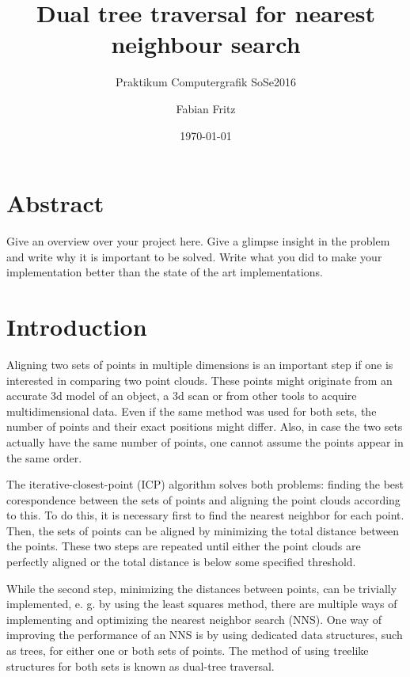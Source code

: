 \documentclass{utue} %
\title{Dual tree traversal for nearest neighbour search}
\author{Fabian Fritz}
\date{\today}
\subtitle{Praktikum Computergrafik SoSe2016}
\begin{document}

\maketitle

\section*{Abstract}

Give an overview over your project here. Give a glimpse insight in the problem and write why it is important to be solved. Write what you did to make your implementation better than the state of the art implementations.


\section{Introduction}

Aligning two sets of points in multiple dimensions is an important step if one is interested in comparing two point clouds. These points might originate from an accurate 3d model of an object, a 3d scan or from other tools to acquire multidimensional data. Even if the same method was used for both sets, the number of points and their exact positions might differ. Also, in case the two sets actually have the same number of points, one cannot assume the points appear in the same order.

The iterative-closest-point (ICP) algorithm solves both problems: finding the best corespondence between the sets of points and aligning the point clouds according to this. To do this, it is necessary first to find the nearest neighbor for each point. Then, the sets of points can be aligned by minimizing the total distance between the points. These two steps are repeated until either the point clouds are perfectly aligned or the total distance is below some specified threshold.

While the second step, minimizing the distances between points, can be trivially implemented, e. g. by using the least squares method, there are multiple ways of implementing and optimizing the nearest neighbor search (NNS). One way of improving the performance of an NNS is by using dedicated data structures, such as trees, for either one or both sets of points. The method of using treelike structures for both sets is known as dual-tree traversal.
\end{document}
